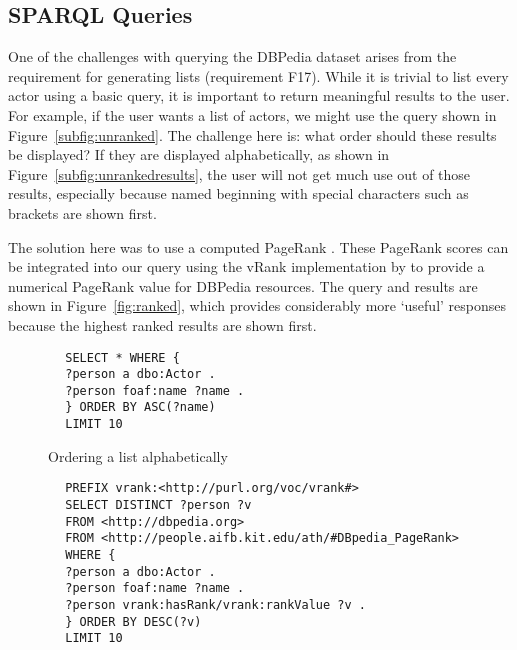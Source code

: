 \subsection{SPARQL Queries}
One of the challenges with querying the DBPedia dataset arises from the requirement for generating lists (requirement F17). While it is trivial to list every actor using a basic query, it is important to return meaningful results to the user. For example, if the user wants a list of actors, we might use the query shown in Figure~\ref{subfig:unranked}. The challenge here is: what order should these results be displayed? If they are displayed alphabetically, as shown in Figure~\ref{subfig:unrankedresults}, the user will not get much use out of those results, especially because named beginning with special characters such as brackets are shown first.

The solution here was to use a computed PageRank \cite{rank2014}. These PageRank scores can be integrated into our query using the vRank implementation by \citet{rank2012} to provide a numerical PageRank value for DBPedia resources. The query and results are shown in Figure~\ref{fig:ranked}, which provides considerably more `useful' responses because the highest ranked results are shown first.

\newsavebox\unrankbox
\begin{lrbox}{\unrankbox}
	\begin{lstlisting}
		SELECT * WHERE {
		?person a dbo:Actor .
		?person foaf:name ?name .
		} ORDER BY ASC(?name)
		LIMIT 10
	\end{lstlisting}
\end{lrbox}

\begin{figure}[p]
	\centering
	 \qquad
	\caption{Ordering a list alphabetically}
	\label{fig:unranked}
\end{figure}

\newsavebox\rankbox
\begin{lrbox}{\rankbox}
	\begin{lstlisting}
		PREFIX vrank:<http://purl.org/voc/vrank#>
		SELECT DISTINCT ?person ?v
		FROM <http://dbpedia.org>
		FROM <http://people.aifb.kit.edu/ath/#DBpedia_PageRank>
		WHERE {
		?person a dbo:Actor .
		?person foaf:name ?name .
		?person vrank:hasRank/vrank:rankValue ?v .
		} ORDER BY DESC(?v)
		LIMIT 10
	\end{lstlisting}
\end{lrbox}

